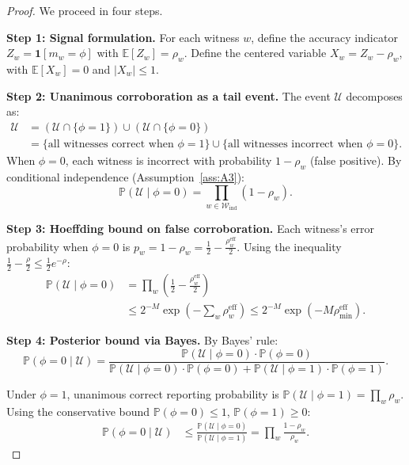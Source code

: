 \documentclass[11pt,a4paper]{article}
\theoremstyle{definition}
\newcommand{\E}{\mathbb{E}}
\newcommand{\Pbb}{\mathbb{P}}
\newcommand{\ind}[1]{\mathbf{1}[#1]}
\newcommand{\abs}[1]{\left|#1\right|}
\newcommand{\witnessSet}{\mathcal{W}}           %
\newcommand{\fact}{\phi}                        %
\begin{document}
\begin{proof}
We proceed in four steps.

\medskip\noindent\textbf{Step 1: Signal formulation.}
For each witness $w$, define the accuracy indicator $Z_w = \ind{m_w = \fact}$ with $\E[Z_w] = \rho_w$. Define the centered variable $X_w = Z_w - \rho_w$, with $\E[X_w] = 0$ and $\abs{X_w} \leq 1$.

\medskip\noindent\textbf{Step 2: Unanimous corroboration as a tail event.}
The event $\mathcal{U}$ decomposes as:
\begin{align}
    \mathcal{U} &= (\mathcal{U} \cap \{\fact = 1\}) \cup (\mathcal{U} \cap \{\fact = 0\}) \nonumber\\
    &= \{\text{all witnesses correct when } \fact = 1\} \cup \{\text{all witnesses incorrect when } \fact = 0\}.
\end{align}
When $\fact = 0$, each witness is incorrect with probability $1 - \rho_w$ (false positive). By conditional independence (Assumption~\ref{ass:A3}):
\begin{equation}
    \Pbb(\mathcal{U} \mid \fact = 0) = \prod_{w \in \witnessSet_{\mathrm{ind}}} (1 - \rho_w).
    \label{eq:false_positive_chain}
\end{equation}

\medskip\noindent\textbf{Step 3: Hoeffding bound on false corroboration.}
Each witness's error probability when $\fact = 0$ is $p_w = 1 - \rho_w = \frac{1}{2} - \frac{\rho_w^{\mathrm{eff}}}{2}$. Using the inequality $\frac{1}{2} - \frac{\rho}{2} \leq \frac{1}{2}e^{-\rho}$:
\begin{align}
    \Pbb(\mathcal{U} \mid \fact = 0) &= \prod_{w} \left(\frac{1}{2} - \frac{\rho_w^{\mathrm{eff}}}{2}\right) \nonumber\\
    &\leq 2^{-M} \exp\left(-\sum_{w} \rho_w^{\mathrm{eff}}\right) \leq 2^{-M} \exp(-M \rho_{\min}^{\mathrm{eff}}).
\end{align}

\medskip\noindent\textbf{Step 4: Posterior bound via Bayes.}
By Bayes' rule:
\begin{equation}
    \Pbb(\fact = 0 \mid \mathcal{U}) = \frac{\Pbb(\mathcal{U} \mid \fact = 0) \cdot \Pbb(\fact = 0)}{\Pbb(\mathcal{U} \mid \fact = 0) \cdot \Pbb(\fact = 0) + \Pbb(\mathcal{U} \mid \fact = 1) \cdot \Pbb(\fact = 1)}.
\end{equation}

Under $\fact = 1$, unanimous correct reporting probability is $\Pbb(\mathcal{U} \mid \fact = 1) = \prod_w \rho_w$. Using the conservative bound $\Pbb(\fact = 0) \leq 1$, $\Pbb(\fact = 1) \geq 0$:
\begin{align}
    \Pbb(\fact = 0 \mid \mathcal{U}) &\leq \frac{\Pbb(\mathcal{U} \mid \fact = 0)}{\Pbb(\mathcal{U} \mid \fact = 1)}
    = \prod_w \frac{1 - \rho_w}{\rho_w}.
\end{align}


\end{proof}
\end{document}
